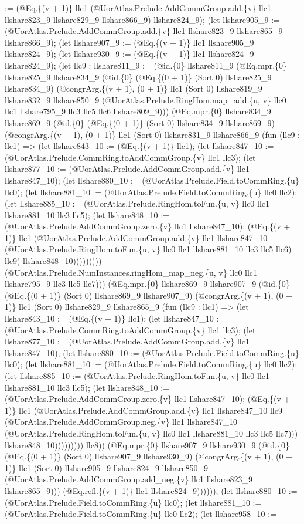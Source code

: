 \documentclass[11pt]{article}
\begin{document}
:= (@Eq.\{(v + 1)\} llc1 (@UorAtlas.Prelude.AddCommGroup.add.\{v\} llc1 llshare823\_9 llshare829\_9 llshare866\_9) llshare824\_9); (let llshare905\_9 := (@UorAtlas.Prelude.AddCommGroup.add.\{v\} llc1 llshare823\_9 llshare865\_9 llshare866\_9); (let llshare907\_9 := (@Eq.\{(v + 1)\} llc1 llshare905\_9 llshare824\_9); (let llshare930\_9 := (@Eq.\{(v + 1)\} llc1 llshare824\_9 llshare824\_9); (let llc9 : llshare811\_9 := (@id.\{0\} llshare811\_9 (@Eq.mpr.\{0\} llshare825\_9 llshare834\_9 (@id.\{0\} (@Eq.\{(0 + 1)\} (Sort 0) llshare825\_9 llshare834\_9) (@congrArg.\{(v + 1), (0 + 1)\} llc1 (Sort 0) llshare819\_9 llshare832\_9 llshare850\_9 (@UorAtlas.Prelude.RingHom.map\_add.\{u, v\} llc0 llc1 llshare795\_9 llc3 llc5 llc6 llshare809\_9))) (@Eq.mpr.\{0\} llshare834\_9 llshare869\_9 (@id.\{0\} (@Eq.\{(0 + 1)\} (Sort 0) llshare834\_9 llshare869\_9) (@congrArg.\{(v + 1), (0 + 1)\} llc1 (Sort 0) llshare831\_9 llshare866\_9 (fun (llc9 : llc1) => (let llshare843\_10 := (@Eq.\{(v + 1)\} llc1); (let llshare847\_10 := (@UorAtlas.Prelude.CommRing.toAddCommGroup.\{v\} llc1 llc3); (let llshare877\_10 := (@UorAtlas.Prelude.AddCommGroup.add.\{v\} llc1 llshare847\_10); (let llshare880\_10 := (@UorAtlas.Prelude.Field.toCommRing.\{u\} llc0); (let llshare881\_10 := (@UorAtlas.Prelude.Field.toCommRing.\{u\} llc0 llc2); (let llshare885\_10 := (@UorAtlas.Prelude.RingHom.toFun.\{u, v\} llc0 llc1 llshare881\_10 llc3 llc5); (let llshare848\_10 := (@UorAtlas.Prelude.AddCommGroup.zero.\{v\} llc1 llshare847\_10); (@Eq.\{(v + 1)\} llc1 (@UorAtlas.Prelude.AddCommGroup.add.\{v\} llc1 llshare847\_10 (@UorAtlas.Prelude.RingHom.toFun.\{u, v\} llc0 llc1 llshare881\_10 llc3 llc5 llc6) llc9) llshare848\_10))))))))) (@UorAtlas.Prelude.NumInstances.ringHom\_map\_neg.\{u, v\} llc0 llc1 llshare795\_9 llc3 llc5 llc7))) (@Eq.mpr.\{0\} llshare869\_9 llshare907\_9 (@id.\{0\} (@Eq.\{(0 + 1)\} (Sort 0) llshare869\_9 llshare907\_9) (@congrArg.\{(v + 1), (0 + 1)\} llc1 (Sort 0) llshare829\_9 llshare865\_9 (fun (llc9 : llc1) => (let llshare843\_10 := (@Eq.\{(v + 1)\} llc1); (let llshare847\_10 := (@UorAtlas.Prelude.CommRing.toAddCommGroup.\{v\} llc1 llc3); (let llshare877\_10 := (@UorAtlas.Prelude.AddCommGroup.add.\{v\} llc1 llshare847\_10); (let llshare880\_10 := (@UorAtlas.Prelude.Field.toCommRing.\{u\} llc0); (let llshare881\_10 := (@UorAtlas.Prelude.Field.toCommRing.\{u\} llc0 llc2); (let llshare885\_10 := (@UorAtlas.Prelude.RingHom.toFun.\{u, v\} llc0 llc1 llshare881\_10 llc3 llc5); (let llshare848\_10 := (@UorAtlas.Prelude.AddCommGroup.zero.\{v\} llc1 llshare847\_10); (@Eq.\{(v + 1)\} llc1 (@UorAtlas.Prelude.AddCommGroup.add.\{v\} llc1 llshare847\_10 llc9 (@UorAtlas.Prelude.AddCommGroup.neg.\{v\} llc1 llshare847\_10 (@UorAtlas.Prelude.RingHom.toFun.\{u, v\} llc0 llc1 llshare881\_10 llc3 llc5 llc7))) llshare848\_10))))))))) llc8)) (@Eq.mpr.\{0\} llshare907\_9 llshare930\_9 (@id.\{0\} (@Eq.\{(0 + 1)\} (Sort 0) llshare907\_9 llshare930\_9) (@congrArg.\{(v + 1), (0 + 1)\} llc1 (Sort 0) llshare905\_9 llshare824\_9 llshare850\_9 (@UorAtlas.Prelude.AddCommGroup.add\_neg.\{v\} llc1 llshare823\_9 llshare865\_9))) (@Eq.refl.\{(v + 1)\} llc1 llshare824\_9)))))); (let llshare880\_10 := (@UorAtlas.Prelude.Field.toCommRing.\{u\} llc0); (let llshare881\_10 := (@UorAtlas.Prelude.Field.toCommRing.\{u\} llc0 llc2); (let llshare958\_10 := 
\end{document}
